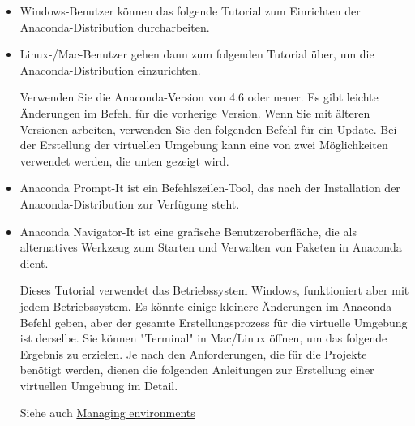 \begin{itemize}
    \item Windows-Benutzer können das folgende Tutorial zum Einrichten der Anaconda-Distribution durcharbeiten.
    
    \medskip
    
    
    \item Linux-/Mac-Benutzer gehen dann zum folgenden Tutorial über, um die Anaconda-Distribution einzurichten.
    
    \medskip
    
    
    Verwenden Sie die Anaconda-Version von 4.6 oder neuer. Es gibt leichte Änderungen im Befehl für die vorherige Version. Wenn Sie mit älteren Versionen arbeiten, verwenden Sie den folgenden Befehl für ein Update.
     Bei der Erstellung der virtuellen Umgebung kann eine von zwei Möglichkeiten verwendet werden, die unten gezeigt wird. 
    
    \item Anaconda Prompt-It ist ein Befehlszeilen-Tool, das nach der Installation der Anaconda-Distribution zur Verfügung steht.
    
    \item Anaconda Navigator-It ist eine grafische Benutzeroberfläche, die als alternatives Werkzeug zum Starten und Verwalten von Paketen in Anaconda dient.
    
    Dieses Tutorial verwendet das Betriebssystem Windows, funktioniert aber mit jedem Betriebssystem. Es könnte einige kleinere Änderungen im Anaconda-Befehl geben, aber der gesamte Erstellungsprozess für die virtuelle Umgebung ist derselbe. Sie können "Terminal" in Mac/Linux öffnen, um das folgende Ergebnis zu erzielen. Je nach den Anforderungen, die für die Projekte benötigt werden, dienen die folgenden Anleitungen zur Erstellung einer virtuellen Umgebung im Detail.
    
    Siehe auch \href{https://docs.conda.io/projects/conda/en/latest/user-guide/tasks/manage-environments.html}{Managing environments}
    
\end{itemize}



